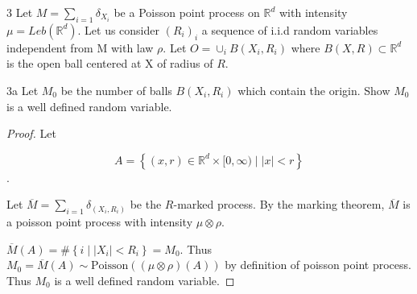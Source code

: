 \documentclass{article}
\newcommand{\R}{\mathbb{R}}
\newcommand{\abs}[1]{\left\lvert #1\right\rvert}
\newcommand{\Poi}[0]{\text{Poisson}}
\begin{document}
\bigskip

\begin{PROB}{3}\label{Problem 3.}
    Let $M = \sum_{i = 1} \delta_{X_i}$ be a Poisson point process on $\R^d$ with intensity $\mu = Leb(\R^d)$. Let us consider $(R_i)_{i}$ a sequence of i.i.d random variables independent from M with law $\rho$. Let $O = \cup_{i} B(X_i, R_i)$ where $B(X, R) \subset \R^d$ is the open ball centered at X of radius of $R$.        
\end{PROB}
\begin{claim}{3a}\label{Claim 3a.}
    Let $M_0$ be the number of balls $B(X_i, R_i)$ which contain the origin. Show $M_0$ is a well defined random variable.    
\end{claim}
\begin{proof}
    Let 
    
    \[A = \left\{ (x, r) \in \R^d \times [0, \infty)\mid \abs{x} < r \right\}\]. 
    
    Let $\overline{M} = \sum_{i = 1} \delta_{(X_i, R_i)}$ be the $R$-marked process. By the marking theorem, $\overline{M}$ is a poisson point process with intensity $\mu \otimes \rho$.    

    $\overline{M}(A) = \#\left\{ i \mid \abs{X_i} < R_i \right\} = M_0$. Thus $M_0 = \overline{M}(A) \sim \Poi((\mu \otimes \rho)(A))$ by definition of poisson point process. Thus $M_0$ is a well defined random variable.  
\end{proof}
\end{document}
